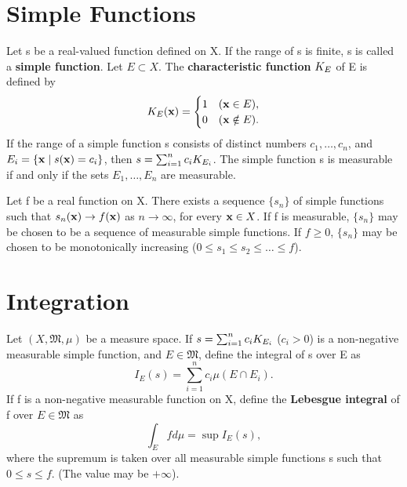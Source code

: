
\section{Simple Functions}

\begin{definition}
  \label{def:chap11:simple_function}
  Let s be a real-valued function defined on X. If the range of s is
  finite, s is called a \textbf{simple function}.
  Let $E \subset X$. The \textbf{characteristic function}
  $K_{E}$ of E is defined by
  \[
    K_{E}(\mathbf{x}) =
    \begin{cases} 1 & (\mathbf{x} \in E), \\ 0 & (\mathbf{x} \notin E).
    \end{cases}
  \]
  If the range of a simple function s consists of distinct numbers
  $c_1, \dots, c_n$, and $E_i = \{ \mathbf{x} \mid s(\mathbf{x}) = c_i
  \}$, then $s = \sum_{i=1}^n c_i K_{E_i}$.
  The simple function s is measurable if and only if the sets $E_1,
  \dots, E_n$ are measurable.
\end{definition}

\begin{theorem}
  \label{thm:chap11:approx_by_simple}
  Let f be a real function on X. There exists a sequence $\{ s_n \}$
  of simple functions such that $s_n(\mathbf{x}) \to f(\mathbf{x})$ as $n
  \to \infty$, for every $\mathbf{x} \in X$. If f is measurable, $\{
  s_n \}$ may be chosen to be a sequence of measurable simple
  functions. If $f \ge 0$, $\{ s_n \}$ may be chosen to be
  monotonically increasing ($0 \le s_1 \le s_2 \le \dots \le f$).
\end{theorem}

\section{Integration}

\begin{definition}
  \label{def:chap11:integral_nonnegative}
  Let $(X, \mathfrak{M}, \mu)$ be a measure space.
  If $s = \sum_{i=1}^n c_i K_{E_i}$ ($c_i > 0$) is a
  non-negative measurable simple function, and $E \in \mathfrak{M}$,
  define the integral of s over E as
  \[
    I_E(s) = \sum_{i=1}^n c_i \mu(E \cap E_i).
  \]
  If f is a non-negative measurable function on X, define the
  \textbf{Lebesgue integral} of f over $E \in \mathfrak{M}$ as
  \[
    \int_E f d\mu = \sup I_E(s),
  \]
  where the supremum is taken over all measurable simple functions s
  such that $0 \le s \le f$. (The value may be $+\infty$).
\end{definition}

